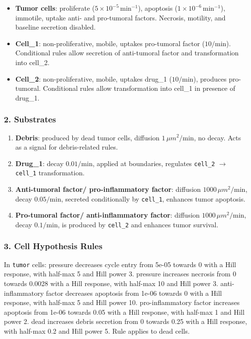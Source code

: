 \documentclass{article}
\begin{document}
\begin{itemize}
  \item \textbf{Tumor cells}: proliferate ($5 \times 10^{-5} \, \text{min}^{-1}$), apoptosis ($1 \times 10^{-6} \, \text{min}^{-1}$), immotile, uptake anti- and pro-tumoral factors. Necrosis, motility, and baseline secretion disabled.
  \item \textbf{Cell\_1}: non-proliferative, mobile, uptakes pro-tumoral factor ($10/\text{min}$). Conditional rules allow secretion of anti-tumoral factor and transformation into cell\_2.
  \item \textbf{Cell\_2}: non-proliferative, mobile, uptakes drug\_1 ($10/\text{min}$), produces pro-tumoral. Conditional rules allow transformation into cell\_1 in presence of drug\_1.
\end{itemize}

\subsubsection*{2. Substrates}

\begin{enumerate}
  \item \textbf{Debris}: produced by dead tumor cells, diffusion $1 \, \mu m^2/\text{min}$, no decay. Acts as a signal for debris-related rules.
  \item \textbf{Drug\_1}: decay $0.01/\text{min}$, applied at boundaries, regulates \texttt{cell\_2} $\rightarrow$ \texttt{cell\_1} transformation.
  \item \textbf{Anti-tumoral factor/ pro-inflammatory factor}: diffusion $1000 \, \mu m^2/\text{min}$, decay $0.05/\text{min}$, secreted conditionally by \texttt{cell\_1}, enhances tumor apoptosis.
  \item \textbf{Pro-tumoral factor/ anti-inflammatory factor}: diffusion $1000 \, \mu m^2/\text{min}$, decay $0.1/\text{min}$, is  produced by \texttt{cell\_2} and enhances tumor survival.
\end{enumerate}

\subsubsection*{3. Cell Hypothesis Rules}

In \texttt{tumor} cells: pressure decreases cycle entry from 5e-05 towards 0 with a Hill response, with half-max 5 and Hill power 3.
pressure increases necrosis from 0 towards 0.0028 with a Hill response, with half-max 10 and Hill power 3.
anti-inflammatory factor decreases apoptosis from 1e-06 towards 0 with a Hill response, with half-max 5 and Hill power 10.
pro-inflammatory factor increases apoptosis from 1e-06 towards 0.05 with a Hill response, with half-max 1 and Hill power 2.
dead increases debris secretion from 0 towards 0.25 with a Hill response, with half-max 0.2 and Hill power 5. Rule applies to dead cells.
\end{document}
